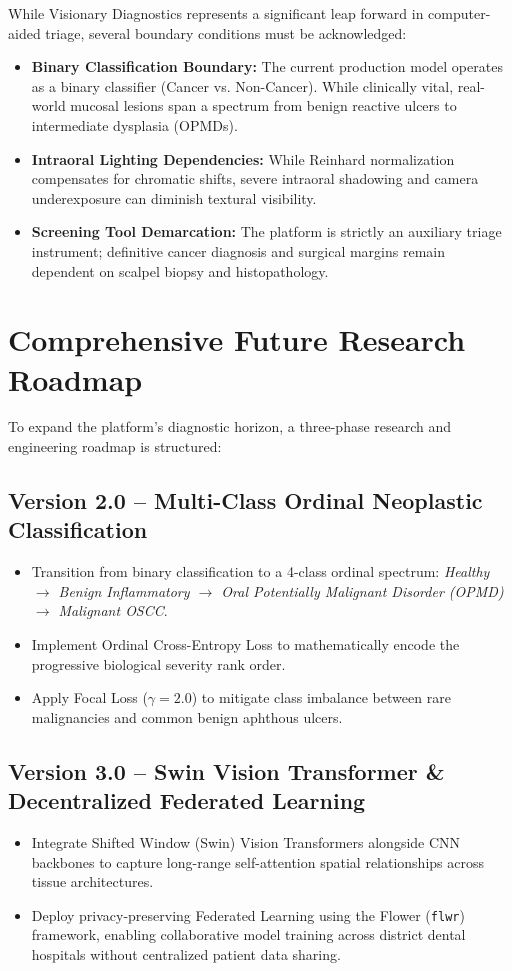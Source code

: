 \documentclass[12pt,a4paper,oneside]{report}
\begin{document}
While Visionary Diagnostics represents a significant leap forward in computer-aided triage, several boundary conditions must be acknowledged:
\begin{itemize}
    \item \textbf{Binary Classification Boundary:} The current production model operates as a binary classifier (Cancer vs. Non-Cancer). While clinically vital, real-world mucosal lesions span a spectrum from benign reactive ulcers to intermediate dysplasia (OPMDs).
    \item \textbf{Intraoral Lighting Dependencies:} While Reinhard normalization compensates for chromatic shifts, severe intraoral shadowing and camera underexposure can diminish textural visibility.
    \item \textbf{Screening Tool Demarcation:} The platform is strictly an auxiliary triage instrument; definitive cancer diagnosis and surgical margins remain dependent on scalpel biopsy and histopathology.
\end{itemize}

\section{Comprehensive Future Research Roadmap}
\label{sec:future_roadmap}

To expand the platform's diagnostic horizon, a three-phase research and engineering roadmap is structured:

\subsection{Version 2.0 -- Multi-Class Ordinal Neoplastic Classification}
\begin{itemize}
    \item Transition from binary classification to a 4-class ordinal spectrum: \textit{Healthy $\rightarrow$ Benign Inflammatory $\rightarrow$ Oral Potentially Malignant Disorder (OPMD) $\rightarrow$ Malignant OSCC}.
    \item Implement Ordinal Cross-Entropy Loss to mathematically encode the progressive biological severity rank order.
    \item Apply Focal Loss ($\gamma = 2.0$) to mitigate class imbalance between rare malignancies and common benign aphthous ulcers.
\end{itemize}

\subsection{Version 3.0 -- Swin Vision Transformer & Decentralized Federated Learning}
\begin{itemize}
    \item Integrate Shifted Window (Swin) Vision Transformers alongside CNN backbones to capture long-range self-attention spatial relationships across tissue architectures.
    \item Deploy privacy-preserving Federated Learning using the Flower (\texttt{flwr}) framework, enabling collaborative model training across district dental hospitals without centralized patient data sharing.
\end{itemize}
\end{document}
